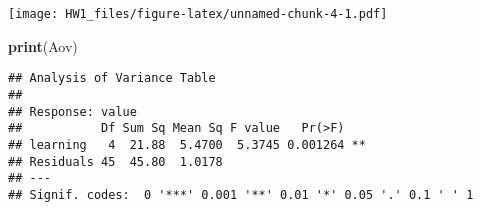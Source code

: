 \documentclass[
]{article}
\newenvironment{Shaded}{\begin{snugshade}}{\end{snugshade}}
\newcommand{\KeywordTok}[1]{\textcolor[rgb]{0.13,0.29,0.53}{\textbf{#1}}}
\newcommand{\NormalTok}[1]{#1}
\begin{document}
\texttt{[image: HW1\_files/figure-latex/unnamed-chunk-4-1.pdf]}

\begin{Shaded}
\begin{Highlighting}[]
\KeywordTok{print}\NormalTok{(Aov)}
\end{Highlighting}
\end{Shaded}

\begin{verbatim}
## Analysis of Variance Table
## 
## Response: value
##           Df Sum Sq Mean Sq F value   Pr(>F)   
## learning   4  21.88  5.4700  5.3745 0.001264 **
## Residuals 45  45.80  1.0178                    
## ---
## Signif. codes:  0 '***' 0.001 '**' 0.01 '*' 0.05 '.' 0.1 ' ' 1
\end{verbatim}
\end{document}
